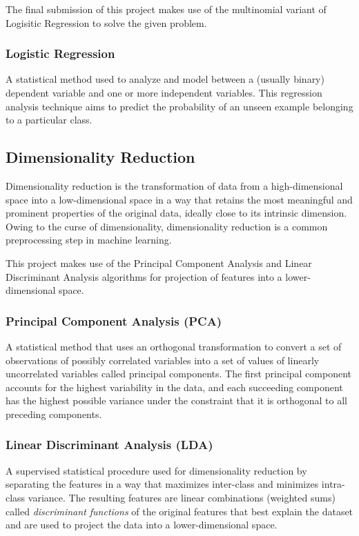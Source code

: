 \documentclass[conference]{IEEEtran}
\begin{document}
    The final submission of this project makes use of the multinomial variant of Logisitic Regression to solve the given problem.
    \vspace*{3.0pt}

    \subsubsection{Logistic Regression}
    \label{sec:lr}
    A statistical method used to analyze and model between a (usually binary) dependent variable and one or more independent variables.
    This regression analysis technique aims to predict the probability of an unseen example belonging to a particular class.

    \subsection{Dimensionality Reduction}
    \label{sec:dimred}
    Dimensionality reduction is the transformation of data from a high-dimensional space into a low-dimensional space in a way that
    retains the most meaningful and prominent properties of the original data, ideally close to its intrinsic dimension.
    Owing to the curse of dimensionality, dimensionality reduction is a common preprocessing step in machine learning.

    This project makes use of the Principal Component Analysis and Linear Discriminant Analysis algorithms for projection of features into a lower-dimensional space.
    \vspace*{3.0pt}

    \subsubsection{Principal Component Analysis (PCA)}
    \label{sec:pca}
    A statistical method that uses an orthogonal transformation to convert a set of observations of possibly correlated variables
    into a set of values of linearly uncorrelated variables called principal components.
    The first principal component accounts for the highest variability in the data, and each succeeding component has the highest possible variance under the constraint
    that it is orthogonal to all preceding components.
    \vspace*{3.0pt}

    \subsubsection{Linear Discriminant Analysis (LDA)}
    \label{sec:lda}
    A supervised statistical procedure used for dimensionality reduction by separating the features in a way that maximizes inter-class and minimizes intra-class variance.
    The resulting features are linear combinations (weighted sums) called \textit{discriminant functions} of the original features that best explain the dataset and are used to
    project the data into a lower-dimensional space.
\end{document}

